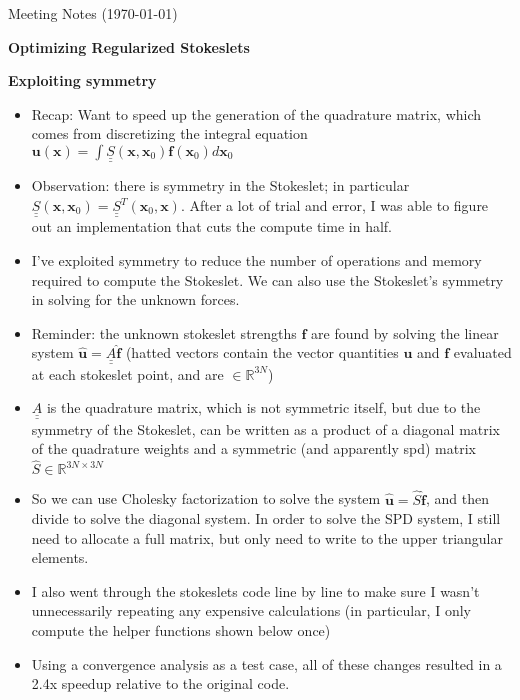 \documentclass{article}
\def\R{\mathbb{R}}
\begin{document}
\pagestyle{plain}

\begin{center}
  {\Large Meeting Notes (\today)}
\end{center}

\large{\textbf{Optimizing Regularized Stokeslets}}

\textbf{Exploiting symmetry}
\begin{itemize}
\item Recap: Want to speed up the generation of the quadrature matrix,
  which comes from discretizing the integral equation
  $\mathbf{u}(\mathbf{x}) = \int \underline{\underline{S}}(\mathbf{x},
  \mathbf{x}_0) \mathbf{f}(\mathbf{x}_0) d\mathbf{x}_0$
\item Observation: there is symmetry in the Stokeslet; in
  particular $\underline{\underline{S}}(\mathbf{x}, \mathbf{x}_0) =
  \underline{\underline{S}}^T(\mathbf{x}_0, \mathbf{x})$. After a lot
  of trial and error, I was able to figure out an implementation that
  cuts the compute time in half.
\item I've exploited symmetry to reduce the number of operations and
  memory required to compute the Stokeslet. We can also use the
  Stokeslet's symmetry in solving for the unknown forces.
\item Reminder: the unknown stokeslet strengths $\mathbf{f}$ are found
  by solving the linear system $\hat{\mathbf{u}} =
  \underline{\underline{A}} \hat{\mathbf{f}}$ (hatted vectors contain
  the vector quantities $\mathbf{u}$ and $\mathbf{f}$ evaluated at
  each stokeslet point, and are $\in \R^{3N}$)
\item $\underline{\underline{A}}$ is the quadrature matrix, which is
  not symmetric itself, but due to the symmetry of the Stokeslet, can
  be written as a product of a diagonal matrix of the quadrature
  weights and a symmetric (and apparently spd) matrix
  $\hat{S} \in \R^{3N \times 3N}$
\item So we can use Cholesky factorization to solve the system
  $\hat{\mathbf{u}} = \hat{S} \hat{\mathbf{f}}$, and then divide to
  solve the diagonal system. In order to solve the SPD system, I still
  need to allocate a full matrix, but only need to write to the upper
  triangular elements.
\item I also went through the stokeslets code line by line to make
  sure I wasn't unnecessarily repeating any expensive calculations (in
  particular, I only compute the helper functions shown below once)
\item Using a convergence analysis as a test case, all of these
  changes resulted in a 2.4x speedup relative to the original code.
\end{itemize}
\end{document}
